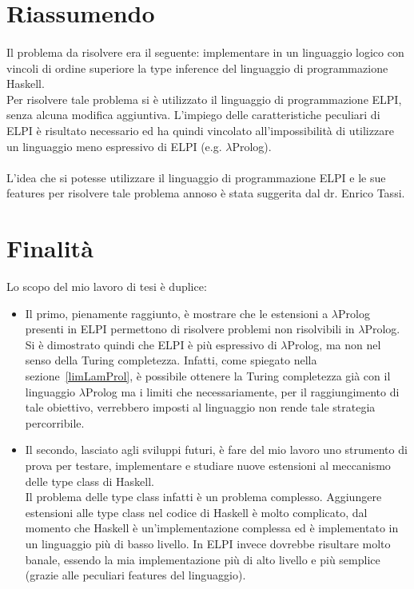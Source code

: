 \documentclass[12pt,a4paper,openright,twoside]{report}
\begin{document}


\section{Riassumendo}

\paragraph{}
Il problema da risolvere era il seguente: implementare in un linguaggio logico con vincoli di ordine superiore la type inference del linguaggio di programmazione Haskell.\\
Per risolvere tale problema si è utilizzato il linguaggio di programmazione ELPI, senza alcuna modifica aggiuntiva. L'impiego delle caratteristiche peculiari di ELPI è risultato necessario ed ha quindi vincolato all'impossibilità di utilizzare un linguaggio meno espressivo di ELPI (e.g. $\lambda$Prolog).

\paragraph{}
L'idea che si potesse utilizzare il linguaggio di programmazione ELPI e le sue features per risolvere tale problema annoso è stata suggerita dal dr. Enrico Tassi.

\section{Finalità}
Lo scopo del mio lavoro di tesi è duplice:
\begin{itemize}
 \item Il primo, pienamente raggiunto, è mostrare che le estensioni a $\lambda$Prolog presenti in ELPI permettono di risolvere problemi non risolvibili in $\lambda$Prolog.\\
 Si è dimostrato quindi che ELPI è più espressivo di $\lambda$Prolog, ma non nel senso della Turing completezza. Infatti, come spiegato nella sezione~\ref{limLamProl}, è possibile ottenere la Turing completezza già con il linguaggio $\lambda$Prolog ma i limiti che necessariamente, per il raggiungimento di tale obiettivo, verrebbero imposti al linguaggio non rende tale strategia percorribile.
 \item Il secondo, lasciato agli sviluppi futuri, è fare del mio lavoro uno strumento di prova per testare, implementare e studiare nuove estensioni al meccanismo delle type class di Haskell.\\
 Il problema delle type class infatti è un problema complesso. Aggiungere estensioni alle type class nel codice di Haskell è molto complicato, dal momento che Haskell è un'implementazione complessa ed è implementato in un linguaggio più di basso livello. In ELPI invece dovrebbe risultare molto banale, essendo la mia implementazione più di alto livello e più semplice (grazie alle peculiari features del linguaggio).
\end{itemize}
\end{document}

